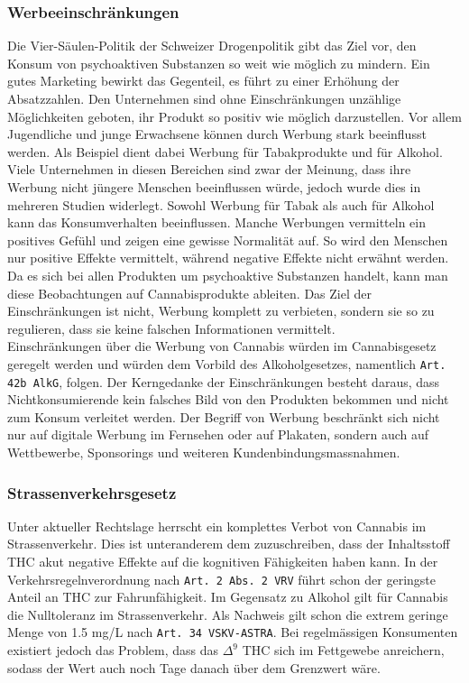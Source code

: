 \documentclass[../main.tex]{subfiles}
\begin{document}
	 \subsubsection{Werbeeinschränkungen}
	 Die Vier-Säulen-Politik der Schweizer Drogenpolitik gibt das Ziel vor, den Konsum von psychoaktiven Substanzen so weit wie möglich zu mindern.
	 Ein gutes Marketing bewirkt das Gegenteil, es führt zu einer Erhöhung der Absatzzahlen.
	 Den Unternehmen sind ohne Einschränkungen unzählige Möglichkeiten geboten, ihr Produkt so positiv wie möglich darzustellen.	 
	 Vor allem Jugendliche und junge Erwachsene können durch Werbung stark beeinflusst werden.
	 Als Beispiel dient dabei Werbung für Tabakprodukte und für Alkohol.
	 Viele Unternehmen in diesen Bereichen sind zwar der Meinung, dass ihre Werbung nicht jüngere Menschen beeinflussen würde, jedoch wurde dies in mehreren Studien widerlegt.
	 Sowohl Werbung für Tabak \cite{lovato} als auch für Alkohol \cite{jernigan} kann das Konsumverhalten beeinflussen.
	 Manche Werbungen vermitteln ein positives Gefühl und zeigen eine gewisse Normalität auf. 
	 So wird den Menschen nur positive Effekte vermittelt, während negative Effekte nicht erwähnt werden.
	 Da es sich bei allen Produkten um psychoaktive Substanzen handelt, kann man diese Beobachtungen auf Cannabisprodukte ableiten.
	 Das Ziel der Einschränkungen ist nicht, Werbung komplett zu verbieten, sondern sie so zu regulieren, dass sie keine falschen Informationen vermittelt.\\
	 
	 \noindent	 
	 Einschränkungen über die Werbung von Cannabis würden im Cannabisgesetz geregelt werden und würden dem Vorbild des Alkoholgesetzes, namentlich \texttt{Art. 42b AlkG}, folgen.
	 Der Kerngedanke der Einschränkungen besteht daraus, dass Nichtkonsumierende kein falsches Bild von den Produkten bekommen und nicht zum Konsum verleitet werden.
	 Der Begriff von Werbung beschränkt sich nicht nur auf digitale Werbung im Fernsehen oder auf Plakaten, sondern auch auf Wettbewerbe, Sponsorings und weiteren Kundenbindungsmassnahmen.
	 
	 	 
	 \subsubsection{Strassenverkehrsgesetz}
	 Unter aktueller Rechtslage herrscht ein komplettes Verbot von Cannabis im Strassenverkehr. 
	 Dies ist unteranderem dem zuzuschreiben, dass der Inhaltsstoff THC akut negative Effekte auf die kognitiven Fähigkeiten haben kann.	 
	 In der Verkehrsregelnverordnung nach \texttt{Art. 2 Abs. 2 VRV} führt schon der geringste Anteil an THC zur Fahrunfähigkeit.
	 Im Gegensatz zu Alkohol gilt für Cannabis die Nulltoleranz im Strassenverkehr.
	 Als Nachweis gilt schon die extrem geringe Menge von 1.5 mg/L nach \texttt{Art. 34 VSKV-ASTRA}.
	 Bei regelmässigen Konsumenten existiert jedoch das Problem, dass das $\Delta^9$ THC sich im Fettgewebe anreichern, sodass der Wert auch noch Tage danach über dem Grenzwert wäre.
	 \\
	 
\end{document}
